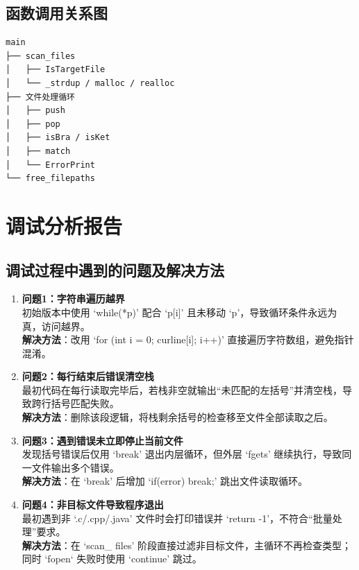 \documentclass[UTF8]{ctexart}
\begin{document}
\subsection{函数调用关系图}
\begin{verbatim}
main
├── scan_files
│   ├── IsTargetFile
│   └── _strdup / malloc / realloc
├── 文件处理循环
│   ├── push
│   ├── pop
│   ├── isBra / isKet
│   ├── match
│   └── ErrorPrint
└── free_filepaths
\end{verbatim}

\section{调试分析报告}

\subsection{调试过程中遇到的问题及解决方法}
\begin{enumerate}
    \item \textbf{问题1：字符串遍历越界} \\
    初始版本中使用 ‘while(*p)’ 配合 ‘p[i]’ 且未移动 ‘p’，导致循环条件永远为真，访问越界。 \\
    \textbf{解决方法}：改用 ‘for (int i = 0; curline[i]; i++)’ 直接遍历字符数组，避免指针混淆。
    
    \item \textbf{问题2：每行结束后错误清空栈} \\
    最初代码在每行读取完毕后，若栈非空就输出“未匹配的左括号”并清空栈，导致跨行括号匹配失败。 \\
    \textbf{解决方法}：删除该段逻辑，将栈剩余括号的检查移至文件全部读取之后。
    
    \item \textbf{问题3：遇到错误未立即停止当前文件} \\
    发现括号错误后仅用 ‘break’ 退出内层循环，但外层 ‘fgets’ 继续执行，导致同一文件输出多个错误。 \\
    \textbf{解决方法}：在 ‘break’ 后增加 ‘if(error) break;’ 跳出文件读取循环。
    
    \item \textbf{问题4：非目标文件导致程序退出} \\
    最初遇到非 ‘.c/.cpp/.java’ 文件时会打印错误并 ‘return -1’，不符合“批量处理”要求。 \\
    \textbf{解决方法}：在 ‘scan\_ files’ 阶段直接过滤非目标文件，主循环不再检查类型；同时 ‘fopen‘ 失败时使用 ‘continue’ 跳过。
\end{enumerate}
\end{document}
